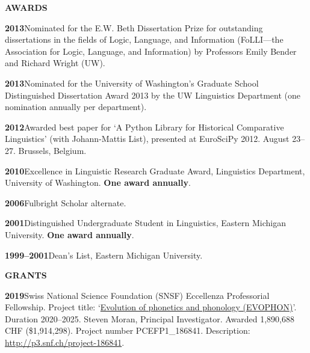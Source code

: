 \documentclass[11pt]{article}
\newcommand{\hangpara}{
 \setlength{\parindent}{0in} %
 \hangindent=0.42in %
}
\begin{document}
\vskip 20pt
\begin{flushleft}
{\bf AWARDS}
\end{flushleft}

\hangpara
{\bf 2013}\hspace{1ex}Nominated for the E.W. Beth Dissertation Prize for outstanding dissertations in the fields of Logic, Language, and Information (FoLLI---the Association for Logic, Language, and Information) by Professors Emily Bender and Richard Wright (UW).

\vskip 6pt
\hangpara
{\bf 2013}\hspace{1ex}Nominated for the University of Washington's Graduate School Distinguished Dissertation Award 2013 by the UW Linguistics Department (one nomination annually per department).

\vskip 6pt
\hangpara
{\bf 2012}\hspace{1ex}Awarded best paper for `A Python Library for Historical Comparative Linguistics' (with Johann-Mattis List), presented at EuroSciPy 2012. August 23--27. Brussels, Belgium.

\vskip 6pt
\hangpara
{\bf 2010}\hspace{1ex}Excellence in Linguistic Research Graduate Award, Linguistics Department, University of Washington. \textbf{One award annually}.

\vskip 6pt
\hangpara
{\bf 2006}\hspace{1ex}Fulbright Scholar alternate.

\vskip 6pt
\hangpara
{\bf 2001}\hspace{1ex}Distinguished Undergraduate Student in Linguistics, Eastern Michigan University. \textbf{One award annually}.

\vskip 6pt
\hangpara
{\bf 1999--2001}\hspace{1ex}Dean's List, Eastern Michigan University.


\vskip 20pt
\begin{flushleft}
{\bf GRANTS}
\end{flushleft}


\hangpara
{\bf 2019}\hspace{1ex}Swiss National Science Foundation (SNSF) Eccellenza Professorial Fellowship. Project title: `\href{http://p3.snf.ch/project-186841}{Evolution of phonetics and phonology (EVOPHON)}'. Duration 2020--2025. Steven Moran, Principal Investigator. Awarded 1,890,688 CHF (\$1,914,298). Project number PCEFP1\_186841. Description: \url{http://p3.snf.ch/project-186841}.
\end{document}
